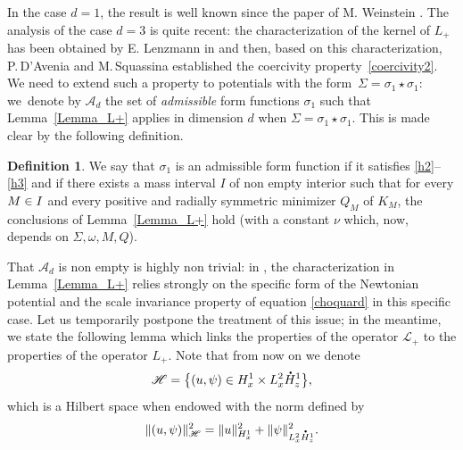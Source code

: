\documentclass[JEP,XML,SOM,NoEqCountersInSection,NoFloatCountersInSection,Unicode,published]{cedram}
\theoremstyle{definition}
\newtheorem{defin}[lemma]{Definition}
\newcommand*{\overbigdot}[1]{%
\accentset{\mbox{\large\bfseries .}}{#1}}
\begin{document}
In the case $d=1$, the result is well known since the paper of M. Weinstein \cite{Weinstein1}. The analysis of the case $d=3$ is quite recent: the characterization of the kernel of $L_{+}$ has been obtained by E. Lenzmann in \cite[Th.\,4]{Lenzmann} and then, based on this characterization, P.\,D'Avenia and M.\,Squassina \cite[Lem.\,2.7]{Avenia_Squassina} established the coercivity property~\eqref{coercivity2}.
We need to extend such a property to potentials with the form~\hbox{$\Sigma=\sigma_{1}\star\sigma_{1}$}:
we~\hbox{denote} by $\mathscr{A}_{d}$ the set of \emph{admissible} form functions
$\sigma_{1}$ such that Lemma~\ref{Lemma_L+} applies in dimension $d$ when $\Sigma=\sigma_{1}\star\sigma_{1}$.
This is made clear by the following definition.

\begin{defin}\label{d:adm}
We say that $\sigma_{1}$ is an admissible form function if it satisfies \eqref{h2}--\eqref{h3} and if there exists a mass interval $I$ of non empty interior such that for every $M\in\nobreak I$ and every positive and radially symmetric minimizer $Q_{M}$ of $K_{M}$,
the conclusions of
Lemma~\ref{Lemma_L+} hold (with a constant $\nu$ which, now, depends on $\Sigma, \omega, M, Q$).
\end{defin}

That $\mathscr{A}_{d}$ is non empty is highly non trivial: in \cite{Lenzmann}, the characterization in Lemma~\ref{Lemma_L+} relies strongly
on the specific form of the Newtonian potential and the scale invariance property of equation \eqref{choquard} in this specific case. Let us temporarily postpone the treatment of this issue; in the meantime, we
state the following lemma which links the properties of the operator $\mathcal{L}_{+}$ to the properties of the operator $L_{+}$. Note that from now on we denote
\[
\mathscr{H}=\bigl \{(u,\psi) \in H_{x}^{1}\times L_{x}^{2}\overbigdot{H}_{z}^{1}\bigr\},
\]
which is a Hilbert space when endowed with the norm defined by
\[
\|(u,\psi) \|_{\mathscr{H}}^{2}=\|u\|_{H_{x}^{1}}^{2}+\|\psi\|_{L_{x}^{2}\overbigdot{H}_{z}^{1}}^{2}.
\]
\end{document}
